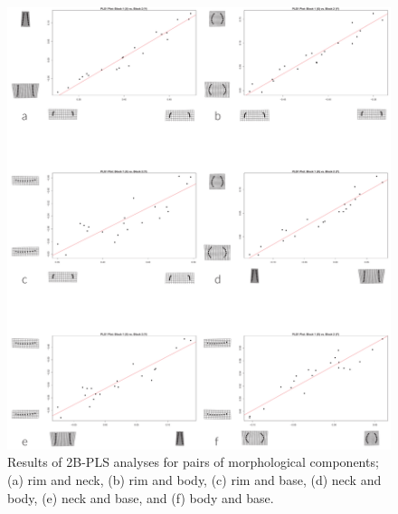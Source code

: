 \documentclass[review]{elsarticle}
\begin{document}
\begin{figure}[htbp]\centering
\includegraphics[width=\linewidth]{heintegr}
\caption{Results of 2B-PLS analyses for pairs of morphological components; (a) rim and neck, (b) rim and body, (c) rim and base, (d) neck and body, (e) neck and base, and (f) body and base.}
\label{fig:heintegr}
\end{figure}
\end{document}
